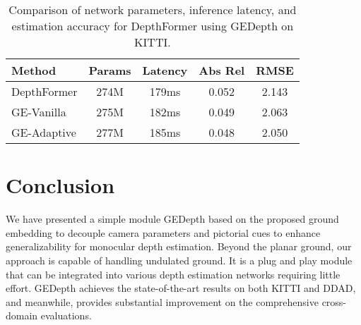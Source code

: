 \documentclass[10pt,twocolumn,letterpaper]{article}
\begin{document}
\begin{table}
\centering
{}
\vspace{3pt}
\caption{Comparison of GEDepth-Vanilla and GEDepth-Adaptive (with DepthFormer) on a subset that is made up of obvious sloping scenes selected from KITTI.
}
\label{tab:eavl_slope_sample}
\end{table}

\begin{table}
\small
\begin{center}
\begin{tabular}{lcccc}
\hline
Method & Params & Latency  & Abs Rel  & RMSE  \\
\hline
DepthFormer & 274M & 179ms & 0.052 & 2.143\\
\hline
GE-Vanilla & 275M & 182ms & 0.049 & 2.063\\
\hline
GE-Adaptive & 277M & 185ms & 0.048 & 2.050\\
\hline
\end{tabular}
\end{center}
\caption{Comparison of network parameters, inference latency, and estimation accuracy for DepthFormer using GEDepth on KITTI.
}
\label{tab:inference_time}
\end{table}


\section{Conclusion}
\label{section:conclusion}
We have presented a simple module GEDepth based on the proposed ground embedding to decouple camera parameters and pictorial cues to enhance generalizability for monocular depth estimation. Beyond the planar ground, our approach is capable of handling undulated ground. It is a plug and play module that can be integrated into various depth estimation networks requiring little effort. GEDepth achieves the state-of-the-art results on both KITTI and DDAD, and meanwhile, provides substantial improvement on the comprehensive cross-domain evaluations.    
\end{document}

